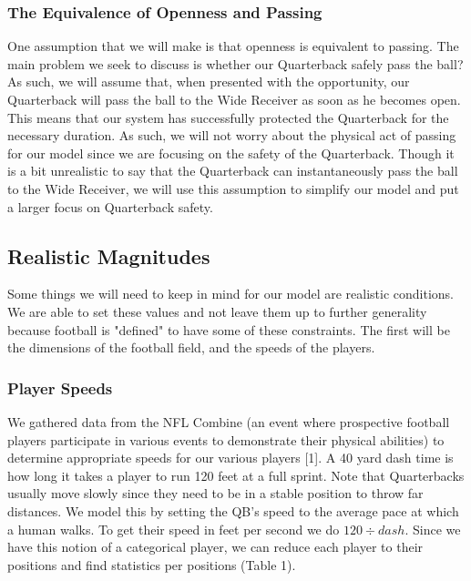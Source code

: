 \subsubsection{The Equivalence of Openness and Passing}

\quad One assumption that we will make is that openness is equivalent to passing. The main problem we seek to discuss is whether our Quarterback safely pass the ball? As such, we will assume that, when presented with the opportunity, our Quarterback will pass the ball to the Wide Receiver as soon as he becomes open. This means that our system has successfully protected the Quarterback for the necessary duration. As such, we will not worry about the physical act of passing for our model since we are focusing on the safety of the Quarterback. Though it is a bit unrealistic to say that the Quarterback can instantaneously pass the ball to the Wide Receiver, we will use this assumption to simplify our model and put a larger focus on Quarterback safety. 

\subsection{Realistic Magnitudes}

\quad Some things we will need to keep in mind for our model are realistic conditions. We are able to set these values and not leave them up to further generality because football is "defined" to have some of these constraints. The first will be the dimensions of the football field, and the speeds of the players. 

\subsubsection{Player Speeds}

\quad We gathered data from the NFL Combine (an event where prospective football players participate in various events to demonstrate their physical abilities) to determine appropriate speeds for our various players [1]. A 40 yard dash time is how long it takes a player to run 120 feet at a full sprint. Note that Quarterbacks usually move slowly since they need to be in a stable position to throw far distances. We model this by setting the QB's speed to the average pace at which a human walks. To get their speed in feet per second we do $120 \div dash$. Since we have this notion of a categorical player, we can reduce each player to their positions and find statistics per positions (Table 1). 

